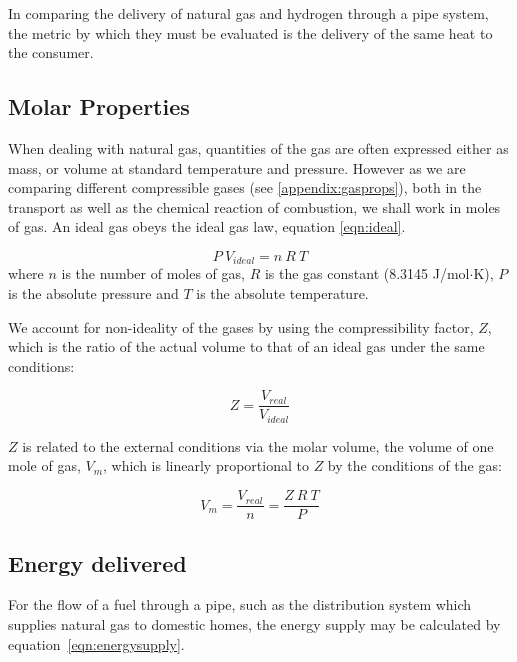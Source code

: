 \documentclass[5p]{elsarticle} %
\begin{document}
In comparing the delivery of natural gas and hydrogen through a pipe system, the metric by which they must be evaluated is the delivery of the same heat to the consumer. 

\subsection{Molar Properties}
\label{sec:molar}

When dealing with natural gas, quantities of the gas are often expressed either as mass, or volume at standard temperature and pressure. 
However as we are comparing different compressible gases (see \ref{appendix:gasprops}), both in the transport as well as the chemical reaction of combustion, we shall work in moles of gas.
An ideal gas obeys the ideal gas law, equation \eqref{eqn:ideal}.

\begin{equation}
    \label{eqn:ideal}
    P \: V_{ideal} = n \: R \: T
\end{equation}
where $n$ is the number of moles of gas, $R$ is the gas constant (8.3145 J/mol$\cdot$K), $P$ is the absolute pressure and $T$ is the absolute temperature.

We account for non-ideality of the gases by using the compressibility factor, $Z$, which is the ratio of the actual volume to that of an ideal gas under the same conditions:

\begin{equation}
    \label{eqn:compressiblity}
    Z = \frac{V_{real}}{V_{ideal}}
\end{equation}

$Z$ is related to the external conditions via the molar volume, the volume of one mole of gas, $V_m$, which is linearly proportional to $Z$ by the conditions of the gas:

\begin{equation}
    \label{eqn:molarvol}
    V_m = \frac{V_{real}}{n} = \frac{Z \: R \: T}{P}
\end{equation}

\subsection{Energy delivered}
\label{sec:energydelivered}

For the flow of a fuel through a pipe, such as the distribution system which supplies natural gas to domestic homes, the energy supply may be calculated by equation~\eqref{eqn:energysupply}.
\end{document}
